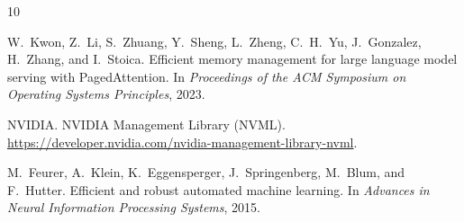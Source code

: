 \documentclass{article}
\begin{document}
\begin{thebibliography}{10}

W.~Kwon, Z.~Li, S.~Zhuang, Y.~Sheng, L.~Zheng, C.~H.~Yu, J.~Gonzalez,
H.~Zhang, and I.~Stoica.
\newblock Efficient memory management for large language model serving with PagedAttention.
\newblock In \emph{Proceedings of the ACM Symposium on Operating Systems Principles}, 2023.

NVIDIA.
\newblock NVIDIA Management Library (NVML).
\newblock \url{https://developer.nvidia.com/nvidia-management-library-nvml}.

M.~Feurer, A.~Klein, K.~Eggensperger, J.~Springenberg, M.~Blum, and F.~Hutter.
\newblock Efficient and robust automated machine learning.
\newblock In \emph{Advances in Neural Information Processing Systems}, 2015.

\end{thebibliography}
\end{document}
